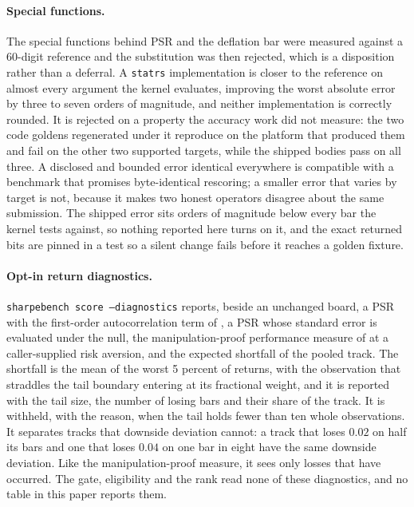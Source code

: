 \paragraph{Special functions.} The special functions behind PSR and the deflation bar were measured against a 60-digit reference and the substitution was then rejected, which is a disposition rather than a deferral. A \texttt{statrs} implementation is closer to the reference on almost every argument the kernel evaluates, improving the worst absolute error by three to seven orders of magnitude, and neither implementation is correctly rounded. It is rejected on a property the accuracy work did not measure: the two code goldens regenerated under it reproduce on the platform that produced them and fail on the other two supported targets, while the shipped bodies pass on all three. A disclosed and bounded error identical everywhere is compatible with a benchmark that promises byte-identical rescoring; a smaller error that varies by target is not, because it makes two honest operators disagree about the same submission. The shipped error sits orders of magnitude below every bar the kernel tests against, so nothing reported here turns on it, and the exact returned bits are pinned in a test so a silent change fails before it reaches a golden fixture.

\paragraph{Opt-in return diagnostics.} \texttt{sharpebench score --diagnostics} reports, beside an unchanged board, a PSR with the first-order autocorrelation term of \citet{lopezdeprado2026howto}, a PSR whose standard error is evaluated under the null, the manipulation-proof performance measure of \citet{goetzmann2007manipulation} at a caller-supplied risk aversion, and the expected shortfall of the pooled track. The shortfall is the mean of the worst 5 percent of returns, with the observation that straddles the tail boundary entering at its fractional weight, and it is reported with the tail size, the number of losing bars and their share of the track. It is withheld, with the reason, when the tail holds fewer than ten whole observations. It separates tracks that downside deviation cannot: a track that loses $0.02$ on half its bars and one that loses $0.04$ on one bar in eight have the same downside deviation. Like the manipulation-proof measure, it sees only losses that have occurred. The gate, eligibility and the rank read none of these diagnostics, and no table in this paper reports them.

